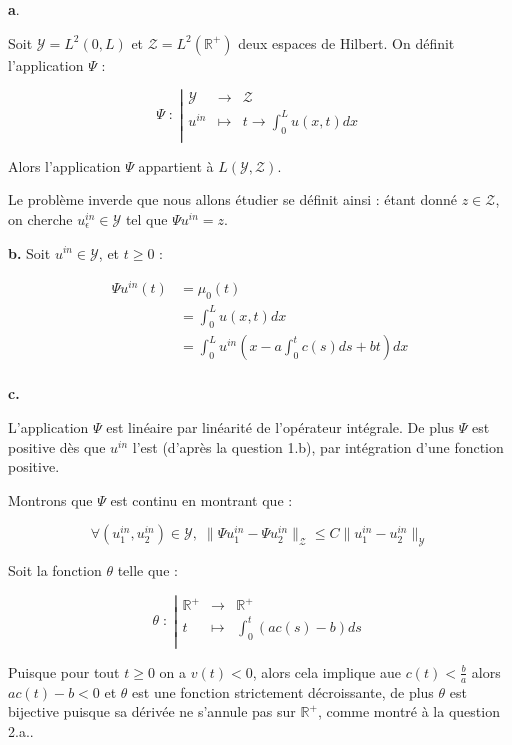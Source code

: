 \documentclass[a4paper]{article}
\newcommand{\Y}{\mathscr{Y}}
\newcommand{\Z}{\mathscr{Z}}
\begin{document}
\textbf{a}.

Soit $\Y = L^2(0,L)$ et $\Z = L^2(\mathbb{R}^+)$ deux espaces de Hilbert. 
On définit l'application $\Psi$ :

 \begin{equation}
	 \Psi \; : \; \left\vert
	\begin{array}{ccc}
	\Y & \to & \Z \\
	u^{in} & \mapsto & t \to \int_0^L u(x,t) dx\\
	\end{array} \right.
\end{equation}

Alors l'application $\Psi$ appartient à $L(\Y,\Z)$.

\begin{definition}
Le problème inverde que nous allons étudier se définit ainsi : 
étant donné $z \in \Z$, on cherche $u_{\epsilon}^{in} \in \Y$ 
tel que $\Psi u^{in} = z$.
\end{definition}

\textbf{b.}
Soit $u^{in} \in \Y$, et $t \geq 0$ :

\[ \begin{split}
\Psi u^{in}(t) &= \mu_0 (t) \\
               &= \int_0^L u(x,t) dx \\
			   &= \int_0^L u^{in}( x - a\int_0^tc(s)ds + bt) dx \\
\end{split}\]

\textbf{c.}

L'application $\Psi$ est linéaire par linéarité de l'opérateur intégrale.
De plus $\Psi $ est positive dès que $u^{in}$ l'est (d'après la question 1.b), par intégration d'une fonction positive.

Montrons que $\Psi$ est continu en montrant que :

\[ \forall (u_1^{in}, u_2^{in}) \in \Y, \; \| \Psi u_1^{in} - \Psi u_2^{in} \|_{\Z} \leq  C \| u_1^{in} - u_2^{in} \|_{\Y}\]

Soit la fonction $\theta$ telle que :

\[\theta \; : \; \left\vert
	\begin{array}{ccc}
	\mathbb{R}^+ & \to & \mathbb{R}^+\\
	t & \mapsto & \int_0^t (ac(s)-b)ds \\
	\end{array} \right.
\]

Puisque pour tout $t \geq 0 $ on a $v(t)<0$,
alors cela implique aue $c(t)< \frac{b}{a}$ alors $ac(t)-b<0$ et $\theta$ est une fonction strictement décroissante, de plus $\theta$ est bijective puisque sa dérivée ne s'annule pas sur $\mathbb{R}^+$, comme montré à la question 2.a..
\end{document}
